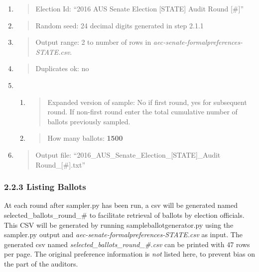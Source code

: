 \documentclass[]{article}
\begin{document}
\begin{enumerate}
\def\labelenumi{\arabic{enumi}.}
\item
  \begin{quote}
  Election Id: ``2016 AUS Senate Election {[}STATE{]} Audit Round
  {[}\#{]}''
  \end{quote}
\item
  \begin{quote}
  Random seed: 24 decimal digits generated in step 2.1.1
  \end{quote}
\item
  \begin{quote}
  Output range: 2 to number of rows in
  \emph{aec-senate-formalpreferences-STATE.csv}.
  \end{quote}
\item
  \begin{quote}
  Duplicates ok: no
  \end{quote}
\item
  \begin{enumerate}
  \def\labelenumii{\alph{enumii}.}
  \item
    \begin{quote}
    Expanded version of sample: No if first round, yes for subsequent
    round. If non-first round enter the total cumulative number of
    ballots previously sampled.
    \end{quote}
  \item
    \begin{quote}
    How many ballots: \textbf{1500}
    \end{quote}
  \end{enumerate}
\item
  \begin{quote}
  Output file: ``2016\_AUS\_Senate\_Election\_{[}STATE{]}\_Audit
  Round\_{[}\#{]}.txt''
  \end{quote}
\end{enumerate}

\subsubsection{2.2.3 Listing Ballots}\label{listing-ballots}

At each round after sampler.py has been run, a csv will be generated
named selected\_ballots\_round\_\# to facilitate retrieval of ballots by
election officials. This CSV will be generated by running
sampleballotgenerator.py using the sampler.py output and
\emph{aec-senate-formalpreferences-STATE.csv} as input. The generated
csv named \emph{selected\_ballots\_round\_\#.csv} can be printed with 47
rows per page. The original preference information is \emph{not} listed
here, to prevent bias on the part of the auditors.
\end{document}

